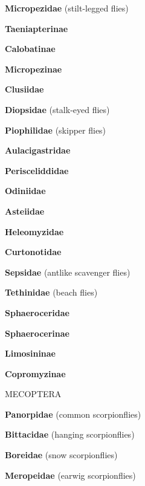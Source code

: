 \documentclass[letterpaper,10pt]{article}
\begin{document}
{\makebox[0.6cm]{}  \textbf{Micropezidae} (stilt-legged flies) \par
\makebox[0.8cm]{}  \textbf{Taeniapterinae} \par
\makebox[0.8cm]{}  \textbf{Calobatinae} \par
\makebox[0.8cm]{}  \textbf{Micropezinae} \par
\makebox[0.6cm]{}  \textbf{Clusiidae} \par
\makebox[0.6cm]{}  \textbf{Diopsidae} (stalk-eyed flies) \par
\makebox[0.6cm]{}  \textbf{Piophilidae} (skipper flies) \par
\makebox[0.6cm]{}  \textbf{Aulacigastridae} \par
\makebox[0.6cm]{}  \textbf{Perisceliddidae} \par
\makebox[0.6cm]{}  \textbf{Odiniidae} \par
\makebox[0.6cm]{}  \textbf{Asteiidae} \par
\makebox[0.6cm]{}  \textbf{Heleomyzidae} \par
\makebox[0.6cm]{}  \textbf{Curtonotidae} \par
\makebox[0.6cm]{}  \textbf{Sepsidae} (antlike scavenger flies) \par
\makebox[0.6cm]{}  \textbf{Tethinidae} (beach flies) \par
\makebox[0.6cm]{}  \textbf{Sphaeroceridae} \par
\makebox[0.8cm]{}  \textbf{Sphaerocerinae} \par
\makebox[0.8cm]{}  \textbf{Limosininae} \par
\makebox[0.8cm]{}  \textbf{Copromyzinae} \par
%
%
%
\makebox[0.0cm]{}  MECOPTERA \par
\makebox[0.6cm]{}  \textbf{Panorpidae} (common scorpionflies) \par
\makebox[0.6cm]{}  \textbf{Bittacidae} (hanging scorpionflies) \par
\makebox[0.6cm]{}  \textbf{Boreidae} (snow scorpionflies) \par
\makebox[0.6cm]{}  \textbf{Meropeidae} (earwig scorpionflies) \par
}
\end{document}
